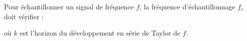 \documentclass[a4paper]{article}
\begin{document}
\pagestyle{fancy}
\fancyhf{}
\setlength{\headheight}{15pt}

\begin{center}
	\large{}
\end{center}


Pour échantillonner un signal de fréquence \(f\), la fréquence d'échantillonnage \(f_e\) doit vérifier :
\begin{center}
\end{center}
où $k$ est l'horizon du développement en série de Taylor de $f$.
\end{document}
